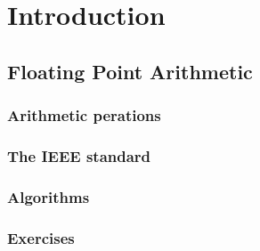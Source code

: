 \chapter{Introduction}\label{chp:introduction}

\section{Floating Point Arithmetic}\label{sec:floating-point-arithmetic}

\subsection{Arithmetic perations}

\subsection{The IEEE standard}

\subsection{Algorithms}

\subsection{Exercises}
